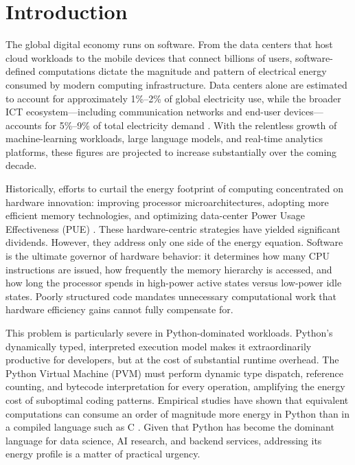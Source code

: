 \documentclass[conference]{IEEEtran}
\begin{document}
\section{Introduction}

The global digital economy runs on software.  From the data centers that
host cloud workloads to the mobile devices that connect billions of users,
software-defined computations dictate the magnitude and pattern of electrical
energy consumed by modern computing infrastructure.  Data centers alone are
estimated to account for approximately 1\%--2\% of global electricity use,
while the broader ICT ecosystem---including communication networks and
end-user devices---accounts for 5\%--9\% of total electricity demand
\cite{ref1}.  With the relentless growth of machine-learning workloads, large
language models, and real-time analytics platforms, these figures are projected
to increase substantially over the coming decade.

Historically, efforts to curtail the energy footprint of computing
concentrated on hardware innovation: improving processor microarchitectures,
adopting more efficient memory technologies, and optimizing data-center Power
Usage Effectiveness (PUE) \cite{ref4}.  These hardware-centric strategies have
yielded significant dividends.  However, they address only one side of the
energy equation.  Software is the ultimate governor of hardware behavior: it
determines how many CPU instructions are issued, how frequently the memory
hierarchy is accessed, and how long the processor spends in high-power active
states versus low-power idle states.  Poorly structured code mandates
unnecessary computational work that hardware efficiency gains cannot fully
compensate for.

This problem is particularly severe in Python-dominated workloads.  Python's
dynamically typed, interpreted execution model makes it extraordinarily
productive for developers, but at the cost of substantial runtime overhead.
The Python Virtual Machine (PVM) must perform dynamic type dispatch, reference
counting, and bytecode interpretation for every operation, amplifying the
energy cost of suboptimal coding patterns.  Empirical studies have shown that
equivalent computations can consume an order of magnitude more energy in Python
than in a compiled language such as C \cite{ref7}.  Given that Python has
become the dominant language for data science, AI research, and backend
services, addressing its energy profile is a matter of practical urgency.
\end{document}
